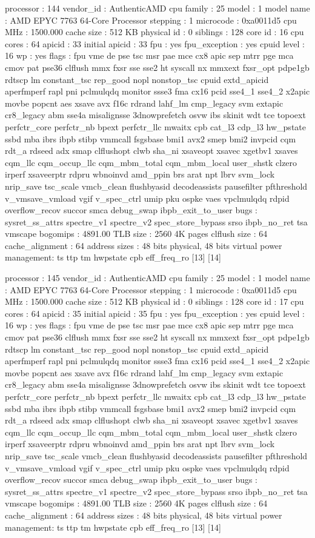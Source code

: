 processor	: 144
vendor_id	: AuthenticAMD
cpu family	: 25
model		: 1
model name	: AMD EPYC 7763 64-Core Processor
stepping	: 1
microcode	: 0xa0011d5
cpu MHz		: 1500.000
cache size	: 512 KB
physical id	: 0
siblings	: 128
core id		: 16
cpu cores	: 64
apicid		: 33
initial apicid	: 33
fpu		: yes
fpu_exception	: yes
cpuid level	: 16
wp		: yes
flags		: fpu vme de pse tsc msr pae mce cx8 apic sep mtrr pge mca cmov pat pse36 clflush mmx fxsr sse sse2 ht syscall nx mmxext fxsr_opt pdpe1gb rdtscp lm constant_tsc rep_good nopl nonstop_tsc cpuid extd_apicid aperfmperf rapl pni pclmulqdq monitor ssse3 fma cx16 pcid sse4_1 sse4_2 x2apic movbe popcnt aes xsave avx f16c rdrand lahf_lm cmp_legacy svm extapic cr8_legacy abm sse4a misalignsse 3dnowprefetch osvw ibs skinit wdt tce topoext perfctr_core perfctr_nb bpext perfctr_llc mwaitx cpb cat_l3 cdp_l3 hw_pstate ssbd mba ibrs ibpb stibp vmmcall fsgsbase bmi1 avx2 smep bmi2 invpcid cqm rdt_a rdseed adx smap clflushopt clwb sha_ni xsaveopt xsavec xgetbv1 xsaves cqm_llc cqm_occup_llc cqm_mbm_total cqm_mbm_local user_shstk clzero irperf xsaveerptr rdpru wbnoinvd amd_ppin brs arat npt lbrv svm_lock nrip_save tsc_scale vmcb_clean flushbyasid decodeassists pausefilter pfthreshold v_vmsave_vmload vgif v_spec_ctrl umip pku ospke vaes vpclmulqdq rdpid overflow_recov succor smca debug_swap ibpb_exit_to_user
bugs		: sysret_ss_attrs spectre_v1 spectre_v2 spec_store_bypass srso ibpb_no_ret tsa vmscape
bogomips	: 4891.00
TLB size	: 2560 4K pages
clflush size	: 64
cache_alignment	: 64
address sizes	: 48 bits physical, 48 bits virtual
power management: ts ttp tm hwpstate cpb eff_freq_ro [13] [14]

processor	: 145
vendor_id	: AuthenticAMD
cpu family	: 25
model		: 1
model name	: AMD EPYC 7763 64-Core Processor
stepping	: 1
microcode	: 0xa0011d5
cpu MHz		: 1500.000
cache size	: 512 KB
physical id	: 0
siblings	: 128
core id		: 17
cpu cores	: 64
apicid		: 35
initial apicid	: 35
fpu		: yes
fpu_exception	: yes
cpuid level	: 16
wp		: yes
flags		: fpu vme de pse tsc msr pae mce cx8 apic sep mtrr pge mca cmov pat pse36 clflush mmx fxsr sse sse2 ht syscall nx mmxext fxsr_opt pdpe1gb rdtscp lm constant_tsc rep_good nopl nonstop_tsc cpuid extd_apicid aperfmperf rapl pni pclmulqdq monitor ssse3 fma cx16 pcid sse4_1 sse4_2 x2apic movbe popcnt aes xsave avx f16c rdrand lahf_lm cmp_legacy svm extapic cr8_legacy abm sse4a misalignsse 3dnowprefetch osvw ibs skinit wdt tce topoext perfctr_core perfctr_nb bpext perfctr_llc mwaitx cpb cat_l3 cdp_l3 hw_pstate ssbd mba ibrs ibpb stibp vmmcall fsgsbase bmi1 avx2 smep bmi2 invpcid cqm rdt_a rdseed adx smap clflushopt clwb sha_ni xsaveopt xsavec xgetbv1 xsaves cqm_llc cqm_occup_llc cqm_mbm_total cqm_mbm_local user_shstk clzero irperf xsaveerptr rdpru wbnoinvd amd_ppin brs arat npt lbrv svm_lock nrip_save tsc_scale vmcb_clean flushbyasid decodeassists pausefilter pfthreshold v_vmsave_vmload vgif v_spec_ctrl umip pku ospke vaes vpclmulqdq rdpid overflow_recov succor smca debug_swap ibpb_exit_to_user
bugs		: sysret_ss_attrs spectre_v1 spectre_v2 spec_store_bypass srso ibpb_no_ret tsa vmscape
bogomips	: 4891.00
TLB size	: 2560 4K pages
clflush size	: 64
cache_alignment	: 64
address sizes	: 48 bits physical, 48 bits virtual
power management: ts ttp tm hwpstate cpb eff_freq_ro [13] [14]

